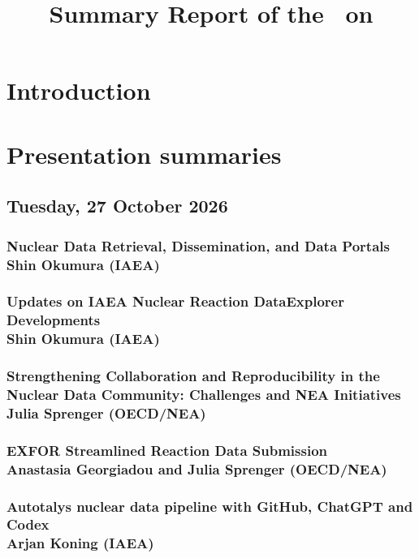 \documentclass{indc-report}
\title{Summary Report of the \meetingtype\ on \meetingsubject}
\begin{document}


\section{Introduction}

\newpage

\section{Presentation summaries}

\subsection{Tuesday, 27 October 2026}

\subsubsection{Nuclear Data Retrieval, Dissemination, and Data Portals\\ Shin Okumura (IAEA)}


\subsubsection{Updates on IAEA Nuclear Reaction DataExplorer Developments\\ Shin Okumura (IAEA)}\label{Pres:SO2} 


\subsubsection{Strengthening Collaboration and Reproducibility in the Nuclear Data Community: Challenges and NEA Initiatives\\ Julia Sprenger (OECD/NEA)}


\subsubsection{EXFOR Streamlined Reaction Data Submission\\ Anastasia Georgiadou and Julia Sprenger (OECD/NEA)}\label{subsec:EXFOR_Streamlined}


\subsubsection{Autotalys nuclear data pipeline with GitHub, ChatGPT and Codex\\ Arjan Koning (IAEA)}

\end{document}

